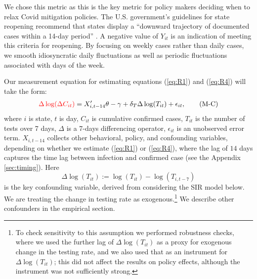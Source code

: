 \documentclass[11pt,reqno,letter]{amsart}
\theoremstyle{definition}
\def\ycolor{\color{red}}
\begin{document}
We chose this metric as this is the key metric for policy makers deciding when to relax Covid mitigation policies.  The U.S. government's guidelines for state reopening
recommend that states display a
``downward trajectory of documented cases within a 14-day period''
\citep{whitehouse2020}. A negative value of
$Y_{it}$ is an indication of meeting this
criteria for reopening. By focusing on weekly cases  rather than daily cases, we smooth idiosyncratic daily fluctuations as well as periodic fluctuations associated with days of the week.

Our measurement equation for estimating equations (\ref{eq:R1}) and (\ref{eq:R4}) will take the form:
\begin{align}
{\ycolor \Delta \log(\Delta C_{it})}  =    X_{i,t-14} '   \theta  -\gamma +  \delta_T \Delta   \log(T_{it})  + \epsilon_{it},
 \label{eq:M} \tag{M-C}
\end{align}
where $i$ is state, $t$ is day, $C_{it}$ is cumulative confirmed
cases, $T_{it}$ is the number of tests over 7 days, $\Delta$ is
a 7-days differencing operator, $\epsilon_{it}$ is an unobserved error term.
 $X_{i,t-14}$  collects other behavioral, policy, and confounding variables, depending
on whether we estimate (\ref{eq:R1}) or (\ref{eq:R4}), where the lag of $14$ days captures the time lag between infection and confirmed case (see the Appendix \ref{sec:timing}). %
   Here
$$\Delta   \log(T_{it} ):=  \log(T_{it}) - \log(T_{i,t-7})  $$ %
is the key confounding variable,
derived from considering the SIR model below. We are treating the change in testing
rate as exogenous.\footnote{To check sensitivity to this assumption
we performed robustness checks, where we used
the further lag of $\Delta   \log(T_{it} )$ as a proxy for exogenous change in the testing rate, and we also
used that as an instrument for $\Delta   \log(T_{it} )$; this did not affect the results on policy effects, although the instrument
was not sufficiently strong.} We describe other confounders in the empirical section.

\end{document}
